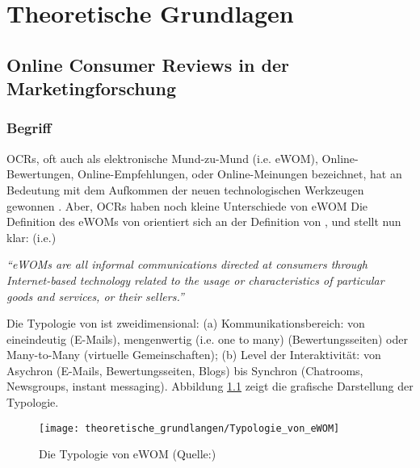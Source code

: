 \chapter{Theoretische Grundlagen}
%
\section{Online Consumer Reviews in der Marketingforschung}
\subsection{Begriff}
\acl{OCRs}, oft auch als elektronische Mund-zu-Mund (\ac{i.e.} \ac{eWOM}), Online-Bewertungen, Online-Empfehlungen, oder Online-Meinungen bezeichnet, hat an Bedeutung mit dem Aufkommen der neuen technologischen Werkzeugen gewonnen \citep{SerraCantallops2014}. Aber, \ac{OCRs} haben noch kleine Unterschiede von \ac{eWOM} Die Definition des \ac{eWOM}s von \citet{Litvin2008} orientiert sich an der Definition von \citet{westbrook1987product}, und stellt nun klar: (\ac{i.e.})

\emph{``\acl{eWOM}s are all informal communications directed at consumers through Internet-based technology related to the usage or characteristics of particular goods and services, or their sellers.''}

Die Typologie von \citeauthor{Litvin2008} ist zweidimensional: (a) Kommunikationsbereich: von eineindeutig (E-Mails), mengenwertig (\ac{i.e.} one to many) (Bewertungsseiten) oder Many-to-Many (virtuelle Gemeinschaften); (b) Level der Interaktivität: von Asychron (E-Mails, Bewertungsseiten, Blogs) bis Synchron (Chatrooms, Newsgroups, instant messaging). Abbildung \ref{fig:typologieVoneWOM} zeigt die grafische Darstellung der Typologie.
\begin{figure}[htb]
	\begin{center}
		\texttt{[image: theoretische\_grundlangen/Typologie\_von\_eWOM]}
		\caption[Die Typologie von eWOM]{Die Typologie von {\ac{eWOM}} (Quelle:\citealp{Litvin2008})}
		\label{fig:typologieVoneWOM}
	\end{center}
\end{figure}

